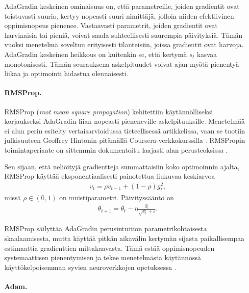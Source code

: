 AdaGradin keskeinen ominaisuus on, että parametreille, joiden gradientit
ovat toistuvasti suuria, kertyy nopeasti suuri nimittäjä, jolloin niiden
efektiivinen oppimisnopeus pienenee. Vastaavasti parametrit, joiden
gradientit ovat harvinaisia tai pieniä, voivat saada suhteellisesti
suurempia päivityksiä. Tämän vuoksi menetelmä soveltuu erityisesti
tilanteisiin, joissa gradientit ovat harvoja. AdaGradin keskeinen
heikkous on kuitenkin se, että kertymä \(s_t\) kasvaa monotonisesti.
Tämän seurauksena askelpituudet voivat ajan myötä pienentyä liikaa ja
optimointi hidastua olennaisesti.

\paragraph{RMSProp.}

RMSProp (\emph{root mean square propagation}) kehitettiin käytännölliseksi
korjaukseksi AdaGradin liian nopeasti pieneneville askelpituuksille.
Menetelmää ei alun perin esitelty vertaisarvioidussa tieteellisessä
artikkelissa, vaan se tuotiin julkisuuteen Geoffrey Hintonin pitämällä
Coursera-verkkokurssilla \cite{tieleman2012lecture}. RMSPropin
toimintaperiaate on sittemmin dokumentoitu laajasti alan perusteoksissa
\cite{goodfellow2016deep}.

Sen sijaan, että neliöityjä gradientteja
summattaisiin koko optimoinnin ajalta, RMSProp käyttää eksponentiaalisesti
painotettua liukuvaa keskiarvoa
\begin{align*}
  v_t
  =
  \rho v_{t-1}+(1-\rho)g_t^2,
\end{align*}
missä \(\rho\in(0,1)\) on muistiparametri. Päivityssääntö on
\begin{align*}
  \theta_{t+1}
  =
  \theta_t
  -
  \eta
  \frac{g_t}{\sqrt{v_t}+\varepsilon}.
\end{align*}

RMSProp säilyttää AdaGradin perusintuition parametrikohtaisesta
skaalaamisesta, mutta käyttää pitkän aikavälin kertymän sijasta
paikallisempaa estimaattia gradienttien mittakaavasta. Tämä estää
oppimisnopeuden systemaattisen pienentymisen ja tekee menetelmästä
käytännössä käyttökelpoisemman syvien neuroverkkojen opetuksessa \cite{goodfellow2016deep}.

\paragraph{Adam.}

